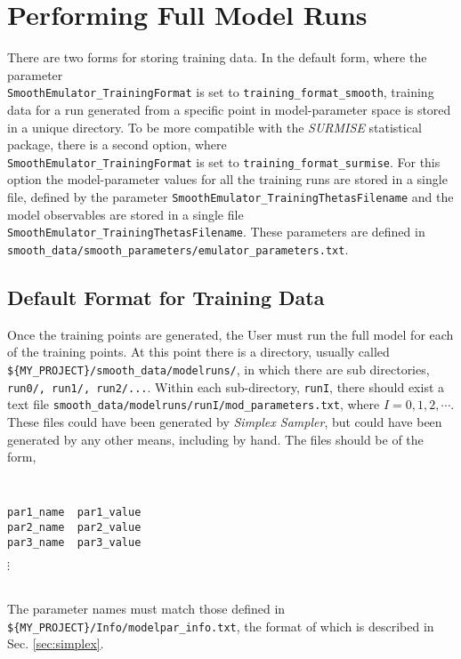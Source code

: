 \documentclass[UserManual.tex]{subfiles}
\begin{document}
\setcounter{section}{3}
\section{Performing Full Model Runs}\label{sec:fullmodel}

There are two forms for storing training data. In the default form, where the parameter\\
{\tt SmoothEmulator\_TrainingFormat} is set to {\tt training\_format\_smooth}, training data for a run generated from a specific point in model-parameter space is stored in a unique directory. To be more compatible with the {\it SURMISE} statistical package, there is a second option, where\\
{\tt SmoothEmulator\_TrainingFormat} is set to {\tt training\_format\_surmise}. For this option the model-parameter values for all the training runs are stored in a single file, defined by the parameter {\tt SmoothEmulator\_TrainingThetasFilename} and the model observables are stored in a single file {\tt SmoothEmulator\_TrainingThetasFilename}. These parameters are defined in\\
{\tt smooth\_data/smooth\_parameters/emulator\_parameters.txt}. 

\subsection{Default Format for Training Data}

Once the training points are generated, the User must run the full model for each of the training points. At this point there is a directory, usually called {\tt \$\{MY\_PROJECT\}/smooth\_data/modelruns/}, in which there are sub directories, {\tt run0/, run1/, run2/...}.  Within each sub-directory, {\tt runI}, there should exist a text file {\tt smooth\_data/modelruns/runI/mod\_parameters.txt}, where $I=0,1,2,\cdots$. These files could have been generated by {\it Simplex Sampler}, but could have been generated by any other means, including by hand. The files should be of the form,
{\tt
\begin{verbatim}
par1_name  par1_value
par2_name  par2_value
par3_name  par3_value
\end{verbatim}\vspace*{-20pt}\hspace*{24pt}$\vdots$
}\\
The parameter names must match those defined in {\tt \$\{MY\_PROJECT\}/Info/modelpar\_info.txt}, the format of which is described in Sec. \ref{sec:simplex}. 
\end{document}
